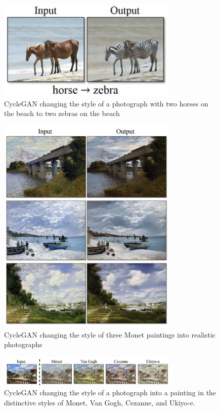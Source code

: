 \documentclass[5p,authoryear]{elsarticle}
\begin{document}
\begin{figure}[!htb] \centering
	\includegraphics[width=3.4in]{figures/CycleGAN4.png}
	\caption[]{CycleGAN changing the style of a photograph with two horses on the beach to two zebras on the beach} \label{zebra} 
\end{figure}


\begin{figure}[!htb] \centering
	\includegraphics[width=3.4in]{figures/CycleGAN2.png}
	\caption[]{CycleGAN changing the style of three Monet paintings into realistic photographs} \label{monet} 
\end{figure}


\begin{figure}[!htb] \centering
	\includegraphics[width=3.4in]{figures/CycleGAN3.png}
	\caption[]{CycleGAN changing the style of a photograph into a painting in the distinctive styles of Monet, Van Gogh, Cezanne, and Ukiyo-e.} \label{paint} 
\end{figure}
\end{document}
